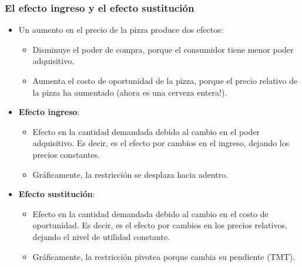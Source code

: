 \documentclass{beamer}
\begin{document}
\begin{frame}
\frametitle{El efecto ingreso y el efecto sustitución}
\begin{itemize}
    \item Un aumento en el precio de la pizza produce dos efectos:
    \begin{itemize}
        \item Disminuye el poder de compra, porque el consumidor tiene menor poder adquisitivo.
        \item Aumenta el costo de oportunidad de la pizza, porque el precio relativo de la pizza ha aumentado (ahora es una cerveza entera!).
    \end{itemize}
    \item \textbf{Efecto ingreso}: 
     \begin{itemize}
     \item Efecto en la cantidad demandada debido al cambio en el poder adquisitivo. Es decir, es el efecto por cambios en el ingreso, dejando los precios constantes.
     \item Gráficamente, la restricción se desplaza hacia adentro.
    \end{itemize}
     
    \item \textbf{Efecto sustitución}:
    \begin{itemize}
     \item Efecto en la cantidad demandada debido al cambio en el costo de oportunidad. Es decir, es el efecto por cambios en los precios relativos, dejando el nivel de utilidad constante.
     \item Gráficamente, la restricción pivotea porque cambia su pendiente (TMT).
    \end{itemize}
\end{itemize} 
\end{frame}
\end{document}
